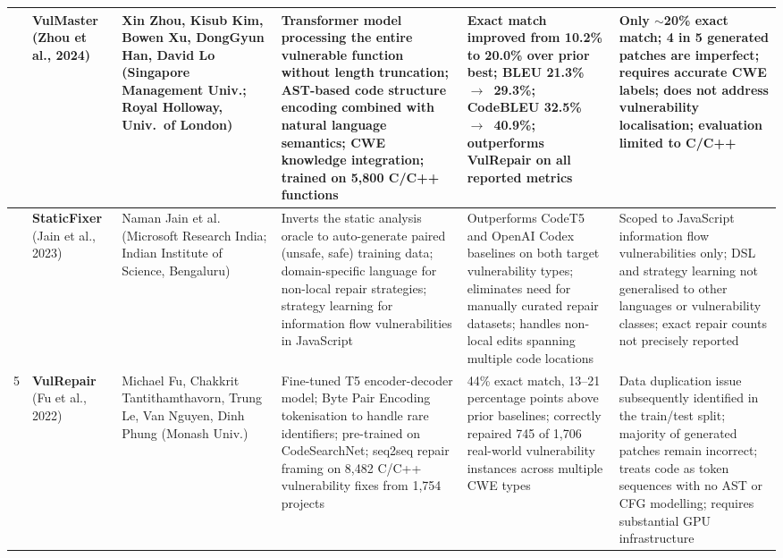 {\begin{longtable}{|>{\centering\arraybackslash}p{0.6cm}|>{\raggedright\arraybackslash}p{1.9cm}|p{2.5cm}|p{3.0cm}|p{3.0cm}|p{3.0cm}|}
3 &
\textbf{VulMaster} \newline \cite{b3} \newline (Zhou et al., 2024) &
Xin Zhou, Kisub Kim, Bowen Xu, DongGyun Han, David Lo \newline (Singapore Management Univ.; Royal Holloway, Univ.\ of London) &
Transformer model processing the entire vulnerable function without length truncation; AST-based code structure encoding combined with natural language semantics; CWE knowledge integration; trained on 5,800 C/C++ functions &
Exact match improved from 10.2\% to 20.0\% over prior best; BLEU 21.3\%~$\to$~29.3\%; CodeBLEU 32.5\%~$\to$~40.9\%; outperforms VulRepair on all reported metrics &
Only $\sim$20\% exact match; 4 in 5 generated patches are imperfect; requires accurate CWE labels; does not address vulnerability localisation; evaluation limited to C/C++ \\
\hline

4 &
\textbf{StaticFixer} \newline \cite{b5} \newline (Jain et al., 2023) &
Naman Jain et al. \newline (Microsoft Research India; Indian Institute of Science, Bengaluru) &
Inverts the static analysis oracle to auto-generate paired (unsafe, safe) training data; domain-specific language for non-local repair strategies; strategy learning for information flow vulnerabilities in JavaScript &
Outperforms CodeT5 and OpenAI Codex baselines on both target vulnerability types; eliminates need for manually curated repair datasets; handles non-local edits spanning multiple code locations &
Scoped to JavaScript information flow vulnerabilities only; DSL and strategy learning not generalised to other languages or vulnerability classes; exact repair counts not precisely reported \\
\hline

5 &
\textbf{VulRepair} \newline \cite{b4} \newline (Fu et al., 2022) &
Michael Fu, Chakkrit Tantithamthavorn, Trung Le, Van Nguyen, Dinh Phung \newline (Monash Univ.) &
Fine-tuned T5 encoder-decoder model; Byte Pair Encoding tokenisation to handle rare identifiers; pre-trained on CodeSearchNet; seq2seq repair framing on 8,482 C/C++ vulnerability fixes from 1,754 projects &
44\% exact match, 13--21 percentage points above prior baselines; correctly repaired 745 of 1,706 real-world vulnerability instances across multiple CWE types &
Data duplication issue subsequently identified in the train/test split; majority of generated patches remain incorrect; treats code as token sequences with no AST or CFG modelling; requires substantial GPU infrastructure \\
\hline


\end{longtable}}
